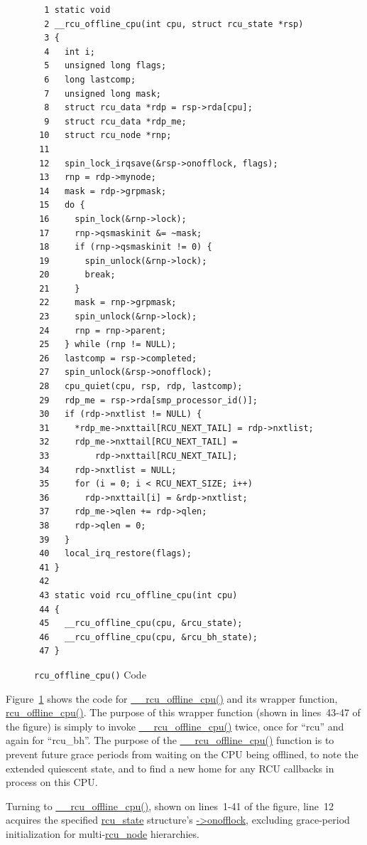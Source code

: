 \begin{figure}[tbp]
{ \scriptsize
\begin{verbatim}
  1 static void
  2 __rcu_offline_cpu(int cpu, struct rcu_state *rsp)
  3 {
  4   int i;
  5   unsigned long flags;
  6   long lastcomp;
  7   unsigned long mask;
  8   struct rcu_data *rdp = rsp->rda[cpu];
  9   struct rcu_data *rdp_me;
 10   struct rcu_node *rnp;
 11 
 12   spin_lock_irqsave(&rsp->onofflock, flags);
 13   rnp = rdp->mynode;
 14   mask = rdp->grpmask;
 15   do {
 16     spin_lock(&rnp->lock);
 17     rnp->qsmaskinit &= ~mask;
 18     if (rnp->qsmaskinit != 0) {
 19       spin_unlock(&rnp->lock);
 20       break;
 21     }
 22     mask = rnp->grpmask;
 23     spin_unlock(&rnp->lock);
 24     rnp = rnp->parent;
 25   } while (rnp != NULL);
 26   lastcomp = rsp->completed;
 27   spin_unlock(&rsp->onofflock);
 28   cpu_quiet(cpu, rsp, rdp, lastcomp);
 29   rdp_me = rsp->rda[smp_processor_id()];
 30   if (rdp->nxtlist != NULL) {
 31     *rdp_me->nxttail[RCU_NEXT_TAIL] = rdp->nxtlist;
 32     rdp_me->nxttail[RCU_NEXT_TAIL] =
 33         rdp->nxttail[RCU_NEXT_TAIL];
 34     rdp->nxtlist = NULL;
 35     for (i = 0; i < RCU_NEXT_SIZE; i++)
 36       rdp->nxttail[i] = &rdp->nxtlist;
 37     rdp_me->qlen += rdp->qlen;
 38     rdp->qlen = 0;
 39   }
 40   local_irq_restore(flags);
 41 }
 42 
 43 static void rcu_offline_cpu(int cpu)
 44 {
 45   __rcu_offline_cpu(cpu, &rcu_state);
 46   __rcu_offline_cpu(cpu, &rcu_bh_state);
 47 }
\end{verbatim}
}
\caption{{\tt rcu\_offline\_cpu()} Code}
\label{fig:app:rcuimpl:rcutreewt:Code for rcu-offline-cpu}
\end{figure}

Figure~\ref{fig:app:rcuimpl:rcutreewt:Code for rcu-offline-cpu}
shows the code for \url{__rcu_offline_cpu()} and its wrapper
function, \url{rcu_offline_cpu()}.
The purpose of this wrapper function (shown in lines~43-47 of the figure)
is simply to invoke \url{__rcu_offline_cpu()} twice, once for ``rcu'' and
again for ``rcu\_bh''.
The purpose of the \url{__rcu_offline_cpu()} function is to
prevent future grace periods from waiting on the CPU being offlined,
to note the extended quiescent state, and to find a new home for
any RCU callbacks in process on this CPU.

Turning to \url{__rcu_offline_cpu()}, shown on lines~1-41 of the figure,
line~12 acquires the specified \url{rcu_state} structure's
\url{->onofflock}, excluding grace-period initialization for
multi-\url{rcu_node} hierarchies.

